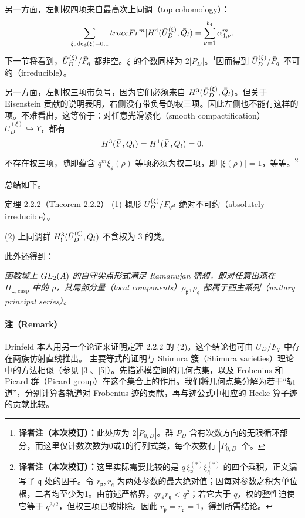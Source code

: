另一方面，左侧权四项来自最高次上同调（top cohomology）：
\[
\sum_{\xi,\,\deg(\xi)=0,1}
traceFr^m|H_!^4(\bar U_D^{(\xi)},\bar{Q}_l)
=\sum_{\nu=1}^{b_4}\alpha_{4,\nu}^m.
\]
下一节将看到，$\bar U_D^{(\xi)}/\bar{F}_q$ 都非空。$\xi$ 的个数同样为 $2|P_D|$。\footnote{\textbf{译者注（本次校订）：}此处应为 $2|P_{0,D}|$。群 $P_D$ 含有次数方向的无限循环部分，而这里仅计数次数为0或1的行列式类，每个次数有 $|P_{0,D}|$ 个。}因而得到
$\bar U_D^{(\xi)}/\bar{F}_q$ 不可约（irreducible）。

另一方面，左侧权三项带负号，因为它们必须来自
$H_!^3(\bar U_D^{(\xi)},\bar{Q}_l)$。但关于 Eisenstein 贡献的说明表明，右侧没有带负号的权三项。因此左侧也不能有这样的项。不难看出，这等价于：对任意光滑紧化（smooth compactification）
$\bar U_D^{(\xi)}\hookrightarrow Y$，都有
\[
H^3(\bar Y,Q_l)=H^1(\bar Y,Q_l)=0.
\]
不存在权三项，随即蕴含 $q^m\xi_{\mathfrak p}(\rho)$ 等项必须为权二项，即 $|\xi(\rho)|=1$，等等。\footnote{\textbf{译者注（本次校订）：}这里实际需要比较的是 $q\,\xi_{\mathfrak p}^{(*)}\xi_{\mathfrak q}^{(*)}$ 的四个乘积，正文漏写了 $\mathfrak q$ 处的因子。令 $r_{\mathfrak p},r_{\mathfrak q}$ 为两处参数的最大绝对值；因每对参数之积为单位根，二者均至少为1。由前述严格界，$q r_{\mathfrak p}r_{\mathfrak q}<q^2$；若它大于 $q$，权的整性迫使它等于 $q^{3/2}$，但权三项已被排除。因此 $r_{\mathfrak p}=r_{\mathfrak q}=1$，得到所需结论。}

总结如下。
\begin{originaltheorem}{定理 2.2.2（Theorem 2.2.2）}
\textup{(1)} 概形 $U_D^{(\xi)}/F_{q^d}$ 绝对不可约（absolutely irreducible）。

\textup{(2)} 上同调群 $H_!^3(\bar U_D^{(\xi)},Q_l)$ 不含权为 $3$ 的类。
\end{originaltheorem}
此外还得到：

\emph{函数域上 $GL_2(A)$ 的自守尖点形式满足 Ramanujan 猜想，即对任意出现在 $H_{\omega,\mathrm{cusp}}$ 中的 $\rho$，其局部分量（local components）$\rho_{\mathfrak p},\rho_{\mathfrak q}$ 都属于酉主系列（unitary principal series）。}
\paragraph*{注（Remark）}
Drinfeld 本人用另一个论证来证明定理 2.2.2 的 (2)。这个结论也可由 $U_D/F_q$ 中存在两族仿射直线推出。
主要等式的证明与 Shimura 簇（Shimura varieties）理论中的方法相似（参见 [3]、[5]）。先描述模空间的几何点集，以及 Frobenius 和 Picard 群（Picard group）在这个集合上的作用。我们将几何点集分解为若干“轨道”，分别计算各轨道对 Frobenius 迹的贡献，再与迹公式中相应的 Hecke 算子迹的贡献比较。
